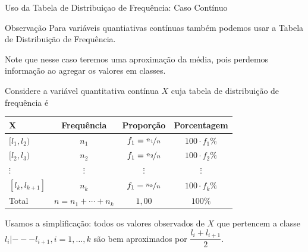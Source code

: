 \documentclass[8pt]{beamer}
\begin{document}
\begin{frame}{Uso da Tabela de Distribuiçao de Frequência: Caso Contínuo}
 \begin{block}{Observação}
  Para variáveis quantiativas contínuas também podemos usar a Tabela de Distribuição de Frequência. 
  
  Note que nesse caso teremos uma {\color{red} aproximação} da média, pois perdemos informação ao agregar os valores 
  em classes.
 \end{block}
 
 Considere a variável quantitativa contínua $X$ cuja tabela de distribuição de frequência é
 
 {\tiny
 \begin{table}
  \centering
  \begin{tabular}{l|ccc}
    \toprule[0.05cm]
    X & Frequência & Proporção & Porcentagem \\ \midrule[0.05cm]
    $ [l_1, l_2)$ & $n_1$ & $f_1=\nicefrac{n_1}{n}$ & $100\cdot f_1 \%$ \\ \hline
    $[l_2, l_3)$ & $n_2$ & $f_1=\nicefrac{n_2}{n}$ & $100\cdot f_2 \%$ \\ \hline
    $\vdots$ & $\vdots$ & $\vdots$ & $\vdots$\\ \hline
    $[l_k, l_{k+1}]$ & $n_k$ & $f_1=\nicefrac{n_k}{n}$ & $100\cdot f_k \%$ \\ \midrule[0.05cm]
    Total & $n=n_1+\cdots+n_k$ & $1,00$ & $100\%$\\ \bottomrule[0.05cm]
  \end{tabular}
 \end{table}
 }

 Usamos a simplificação: todos os valores observados de $X$ que pertencem a classe $l_i |--- l_{i+1}, i =1, \dots, k$ são bem aproximados por $\dfrac{l_i+l_{i+1}}{2}$.
\end{frame}
\end{document}
